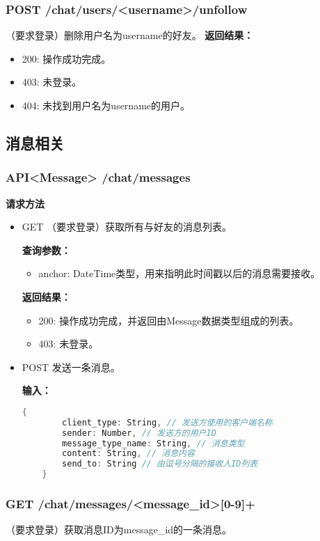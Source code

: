 \subsubsection{\textbf{POST} /chat/users/<username>/unfollow}
（要求登录）删除用户名为username的好友。
\textbf{返回结果：}
\begin{itemize}
    \item 200: 操作成功完成。
    \item 403: 未登录。
    \item 404: 未找到用户名为username的用户。
\end{itemize}

\subsection{消息相关}
\subsubsection{\textbf{API<Message>} /chat/messages}
\textbf{请求方法}
\begin{itemize}
    \item GET
    （要求登录）获取所有与好友的消息列表。

    \textbf{查询参数：}
    \begin{itemize}
        \item anchor: DateTime类型，用来指明此时间戳以后的消息需要接收。
    \end{itemize}

    \textbf{返回结果：}
    \begin{itemize}
    \item 200: 操作成功完成，并返回由Message数据类型组成的列表。
    \item 403: 未登录。
    \end{itemize}
    \item POST
    发送一条消息。

    \textbf{输入：}
    \begin{lstlisting}[language=C]
    {
        client_type: String, // 发送方使用的客户端名称
        sender: Number, // 发送方的用户ID
        message_type_name: String, // 消息类型
        content: String, // 消息内容
        send_to: String // 由逗号分隔的接收人ID列表
    }
    \end{lstlisting}
\end{itemize}

\subsubsection{\textbf{GET} /chat/messages/<message\_id>[0-9]+}
（要求登录）获取消息ID为message\_id的一条消息。

